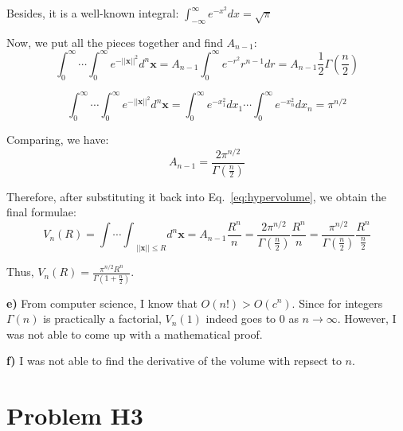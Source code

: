 \documentclass{article}
\begin{document}
Besides, it is a well-known integral: $\int_{-\infty}^{\infty} e^{-x^2} dx = \sqrt{\pi}$

Now, we put all the pieces together and find $A_{n-1}$:
\begin{equation*}
   \int_0^\infty \cdots \int_0^\infty e^{-||\mathbf{x}||^2}  d^n\mathbf{x} = A_{n-1} \int_0^\infty e^{-r^2} r^{n-1} dr = A_{n-1} \frac{1}{2} \Gamma(\frac{n}{2})
 \end{equation*}

 \begin{equation*}
   \int_0^\infty \cdots \int_0^\infty e^{-||\mathbf{x}||^2}  d^n\mathbf{x} = \int_0^\infty e^{-x_1^2} dx_1 \cdots \int_0^\infty e^{-x_n^2} dx_n = \pi^{n/2}
 \end{equation*}

 Comparing, we have:
 \begin{equation*}
   A_{n-1} = \frac{2\pi^{n/2}}{\Gamma(\frac{n}{2})}
 \end{equation*}

 Therefore, after substituting it back into Eq.~\eqref{eq:hypervolume}, we obtain the final formulae:
 \begin{equation*}
   V_n(R) = {\int \cdots \int}_{||\mathbf{x}|| \le R} d^n\mathbf{x}  = A_{n-1}\frac{R^n}{n} =  \frac{2\pi^{n/2}}{\Gamma(\frac{n}{2})} \frac{R^n}{n} = \frac{\pi^{n/2}}{\Gamma(\frac{n}{2})} \frac{R^n}{\frac{n}{2}}
 \end{equation*}

Thus, $V_n(R) = \frac{\pi^{n/2} R^n}{\Gamma(1 + \frac{n}{2})}$.

\textbf{e)} From computer science, I know that $O(n!) > O(c^n)$. Since for integers $\Gamma(n)$ is practically a factorial, $V_n(1)$ indeed goes to $0$ as $n \rightarrow \infty$. However, I was not able to come up with a mathematical proof.

\textbf{f)} I was not able to find the derivative of the volume with repsect to $n$.

\section{ Problem H3 }
\end{document}
